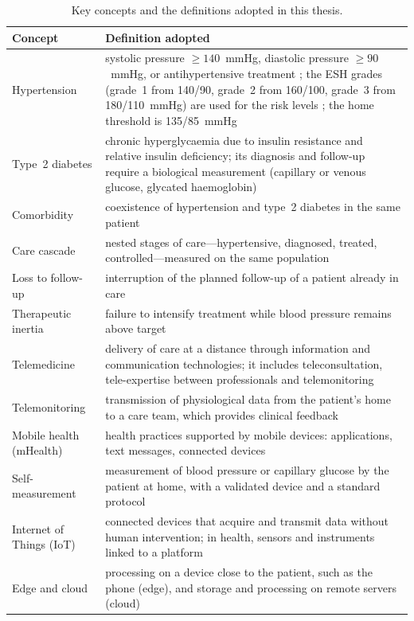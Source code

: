 \begin{table}[htbp]
\centering\footnotesize
\caption{Key concepts and the definitions adopted in this thesis.}\label{tab:concepts}
\begin{tabularx}{\textwidth}{@{}>{\raggedright\arraybackslash}p{3.3cm} X@{}}
\toprule
\textbf{Concept} & \textbf{Definition adopted} \\
\midrule
Hypertension & systolic pressure $\geq 140$~mmHg, diastolic pressure $\geq 90$~mmHg, or antihypertensive treatment \parencite{who2023hypertension}; the ESH grades (grade~1 from 140/90, grade~2 from 160/100, grade~3 from 180/110~mmHg) are used for the risk levels \parencite{mancia2023}; the home threshold is 135/85~mmHg \\
Type~2 diabetes & chronic hyperglycaemia due to insulin resistance and relative insulin deficiency; its diagnosis and follow-up require a biological measurement (capillary or venous glucose, glycated haemoglobin) \\
Comorbidity & coexistence of hypertension and type~2 diabetes in the same patient \\
Care cascade & nested stages of care---hypertensive, diagnosed, treated, controlled---measured on the same population \parencite{who2023hypertension} \\
Loss to follow-up & interruption of the planned follow-up of a patient already in care \\
Therapeutic inertia & failure to intensify treatment while blood pressure remains above target \\
Telemedicine & delivery of care at a distance through information and communication technologies; it includes teleconsultation, tele-expertise between professionals and telemonitoring \\
Telemonitoring & transmission of physiological data from the patient's home to a care team, which provides clinical feedback \\
Mobile health (mHealth) & health practices supported by mobile devices: applications, text messages, connected devices \\
Self-measurement & measurement of blood pressure or capillary glucose by the patient at home, with a validated device and a standard protocol \\
Internet of Things (IoT) & connected devices that acquire and transmit data without human intervention; in health, sensors and instruments linked to a platform \\
Edge and cloud & processing on a device close to the patient, such as the phone (edge), and storage and processing on remote servers (cloud) \\

\end{tabularx}
\end{table}
